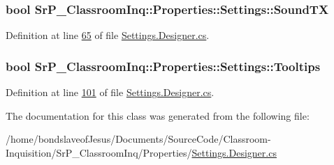 \hypertarget{class_sr_p___classroom_inq_1_1_properties_1_1_settings_a0baa5402bcfc0c013d2c43fd95adc7e2}{
\subsubsection[{\-Sound\-T\-X}]{\setlength{\rightskip}{0pt plus 5cm}bool \-Sr\-P\-\_\-\-Classroom\-Inq\-::\-Properties\-::\-Settings\-::\-Sound\-T\-X}}
\label{class_sr_p___classroom_inq_1_1_properties_1_1_settings_a0baa5402bcfc0c013d2c43fd95adc7e2}


\-Definition at line \hyperlink{_settings_8_designer_8cs_source_l00065}{65} of file \hyperlink{_settings_8_designer_8cs_source}{\-Settings.\-Designer.\-cs}.

\hypertarget{class_sr_p___classroom_inq_1_1_properties_1_1_settings_a321180f5ee03a2226b34422de41e201a}{
\subsubsection[{\-Tooltips}]{\setlength{\rightskip}{0pt plus 5cm}bool \-Sr\-P\-\_\-\-Classroom\-Inq\-::\-Properties\-::\-Settings\-::\-Tooltips}}
\label{class_sr_p___classroom_inq_1_1_properties_1_1_settings_a321180f5ee03a2226b34422de41e201a}


\-Definition at line \hyperlink{_settings_8_designer_8cs_source_l00101}{101} of file \hyperlink{_settings_8_designer_8cs_source}{\-Settings.\-Designer.\-cs}.



\-The documentation for this class was generated from the following file\-:\begin{DoxyCompactItemize}
\item 
/home/bondslaveof\-Jesus/\-Documents/\-Source\-Code/\-Classroom-\/\-Inquisition/\-Sr\-P\-\_\-\-Classroom\-Inq/\-Properties/\hyperlink{_settings_8_designer_8cs}{\-Settings.\-Designer.\-cs}\end{DoxyCompactItemize}
